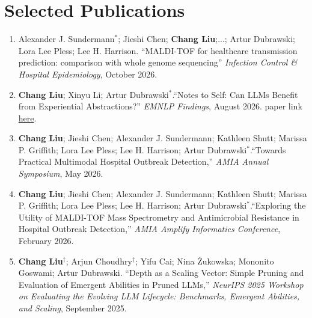 \documentclass[letterpaper,11pt]{article}
\begin{document}
\section{Selected Publications}
\begin{enumerate}
    \item Alexander J. Sundermann$^*$; Jieshi Chen; \textbf{Chang Liu};...; Artur Dubrawski; Lora Lee Pless; Lee H. Harrison. ``MALDI-TOF for healthcare transmission prediction: comparison with whole genome sequencing'' \textit{Infection Control \& Hospital Epidemiology}, October 2026.
    
    \item \textbf{Chang Liu}; Xinyu Li; Artur Dubrawski$^*$.``Notes to Self: Can LLMs Benefit from Experiential Abstractions?''  \textit{EMNLP Findings}, August 2026. paper link \href{https://arxiv.org/abs/2607.20372}{here}.
    
    \item \textbf{Chang Liu}; Jieshi Chen; Alexander J. Sundermann; Kathleen Shutt; Marissa P. Griffith; Lora Lee Pless; Lee H. Harrison; Artur Dubrawski$^*$.``Towards Practical Multimodal Hospital Outbreak Detection,'' \textit{AMIA Annual Symposium}, May 2026.
        
    \item \textbf{Chang Liu}; Jieshi Chen; Alexander J. Sundermann; Kathleen Shutt; Marissa P. Griffith; Lora Lee Pless; Lee H. Harrison; Artur Dubrawski$^*$.``Exploring the Utility of MALDI-TOF Mass Spectrometry and Antimicrobial Resistance in Hospital Outbreak Detection,'' \textit{AMIA Amplify Informatics Conference}, February 2026.

    
    \item \textbf{Chang Liu$^\dag$}; Arjun Choudhry$^\dag$; Yifu Cai; Nina \.{Z}ukowska; Mononito Goswami; Artur Dubrawski. ``Depth as a Scaling Vector: Simple Pruning and Evaluation of Emergent Abilities in Pruned LLMs,'' \textit{NeurIPS 2025 Workshop on Evaluating the Evolving LLM Lifecycle: Benchmarks, Emergent Abilities, and Scaling}, September 2025.


    

\end{enumerate}
\end{document}
